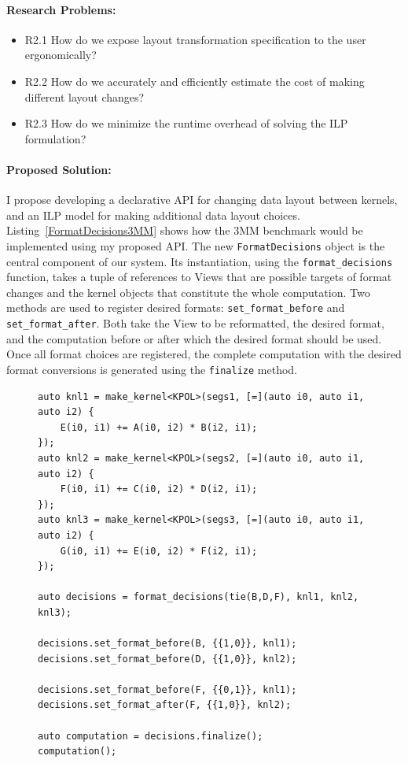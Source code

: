 \documentclass{article}
\begin{document}
\paragraph{Research Problems:}

\begin{itemize}
\item R2.1 How do we expose layout transformation specification to the user ergonomically?
\item R2.2 How do we accurately and efficiently estimate the cost of making different layout changes?
\item R2.3 How do we minimize the runtime overhead of solving the ILP formulation?
\end{itemize}

\paragraph{Proposed Solution:}

I propose developing a declarative API for changing data layout between kernels, and an ILP model for making additional data layout choices.
Listing~\ref{FormatDecisions3MM} shows how the 3MM benchmark would be implemented using my proposed API. 
The new \verb.FormatDecisions. object is the central component of our system. 
Its instantiation, using the \verb.format_decisions. function, takes a tuple of references to Views that are possible targets of format changes and the kernel objects that constitute the whole computation.
Two methods are used to register desired formats: \verb.set_format_before. and \verb.set_format_after..
Both take the View to be reformatted, the desired format, and the computation before or after which the desired format should be used.
Once all format choices are registered, the complete computation with the desired format conversions is generated using the \verb.finalize. method.

\begin{figure}
\begin{lstlisting}[caption={The 3MM benchmark implemented using FormatDecisions.},
    label={FormatDecisions3MM}]
auto knl1 = make_kernel<KPOL>(segs1, [=](auto i0, auto i1, auto i2) {
    E(i0, i1) += A(i0, i2) * B(i2, i1);
});
auto knl2 = make_kernel<KPOL>(segs2, [=](auto i0, auto i1, auto i2) {
    F(i0, i1) += C(i0, i2) * D(i2, i1);
});
auto knl3 = make_kernel<KPOL>(segs3, [=](auto i0, auto i1, auto i2) {
    G(i0, i1) += E(i0, i2) * F(i2, i1);
});

auto decisions = format_decisions(tie(B,D,F), knl1, knl2, knl3);

decisions.set_format_before(B, {{1,0}}, knl1);
decisions.set_format_before(D, {{1,0}}, knl2);

decisions.set_format_before(F, {{0,1}}, knl1);
decisions.set_format_after(F, {{1,0}}, knl2);

auto computation = decisions.finalize();
computation();
\end{lstlisting}
\end{figure}
\end{document}
